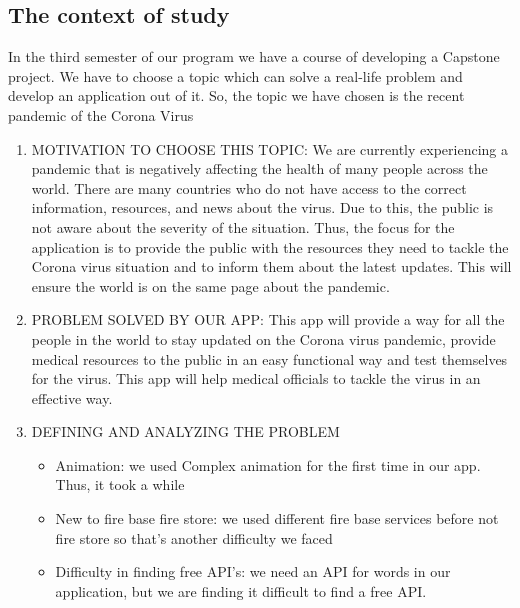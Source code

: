 \subsection{The context of study}
In the third semester of our program we have a course of developing a Capstone project. We have to choose a topic which can solve a real-life problem and develop an application out of it. So, the topic we have chosen is the recent pandemic of the Corona Virus
\begin{enumerate}
    \item MOTIVATION TO CHOOSE THIS TOPIC: We are currently experiencing a pandemic that is negatively affecting the health of many people across the world. There are many countries who do not have access to the correct information, resources, and news about the virus. Due to this, the public is not aware about the severity of the situation. Thus, the focus for the application is to provide the public with the resources they need to tackle the Corona virus situation and to inform them about the latest updates. This will ensure the world is on the same page about the pandemic.
    \item PROBLEM SOLVED BY OUR APP: This app will provide a way for all the people in the world to stay updated on the Corona virus pandemic, provide medical resources to the public in an easy functional way and test themselves for the virus. This app will help medical officials to tackle the virus in an effective way.
    \item DEFINING AND ANALYZING THE PROBLEM
    \begin{itemize}
    \item Animation: we used Complex animation for the first time in our app. Thus, it took a while
    \item New to fire base fire store: we used different fire base services before not fire store so that’s another difficulty we faced
    \item Difficulty in finding free API's: we need an API for words in our application, but we are finding it difficult to find a free API.
\end{itemize}
\end{enumerate}
